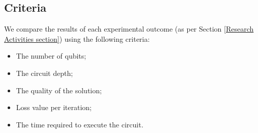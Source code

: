 \subsection{Criteria}
\label{Criteria section}
We compare the results of each experimental outcome (as per Section \ref{Research Activities section}) using the following criteria:
\begin{itemize}
    \item The number of qubits;
    \item The circuit depth;
    \item The quality of the solution;
    \item Loss value per iteration;
    \item The time required to execute the circuit.
\end{itemize}